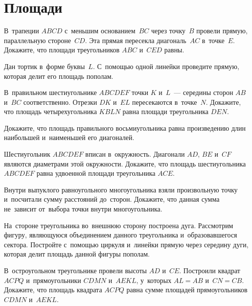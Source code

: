 
\section*{Площади}


\begin{problems}

\item
В~трапеции $ABCD$ с~меньшим основанием~$BC$ через точку~$B$ провели прямую,
параллельную стороне~$CD$.
Эта прямая пересекла диагональ~$AC$ в~точке~$E$.
Докажите, что площади треугольников $ABC$ и~$CED$ равны.

\item
Дан тортик в~форме буквы~$L$.
С~помощью одной линейки проведите прямую, которая
делит его площадь пополам.

\item
В~правильном шестиугольнике $ABCDEF$ точки $K$ и~$L$~---
середины сторон $AB$ и~$BC$ соответственно.
Отрезки $DK$ и~$EL$ пересекаются в~точке~$N$.
Докажите, что площадь четырехугольника $KBLN$ равна площади треугольника $DEN$.

\item
Докажите, что площадь правильного восьмиугольника равна произведению длин
наибольшей и~наименьшей его диагоналей.

\item
Шестиугольник $ABCDEF$ вписан в~окружность.
Диагонали $AD$, $BE$ и~$CF$ являются диаметрами этой окружности.
Докажите, что площадь шестиугольника $ABCDEF$ равна удвоенной площади
треугольника $ACE$.

\item
Внутри выпуклого равноугольного многоугольника взяли произвольную точку
и~посчитали сумму расстояний до~сторон.
Докажите, что данная сумма не~зависит от~выбора точки внутри многоугольника.

\item
На~стороне треугольника во~внешнюю сторону построена дуга.
Рассмотрим фигуру, являющуюся объединением данного треугольника
и~образовавшегося сектора.
Постройте с~помощью циркуля и~линейки прямую через середину дуги, которая делит
площадь данной фигуры пополам.

\item
В~остроугольном треугольнике провели высоты $AD$ и~$CE$.
Построили квадрат $ACPQ$ и~прямоугольники $CDMN$ и~$AEKL$, у~которых $AL = AB$
и~$CN = CB$.
Докажите, что площадь квадрата $ACPQ$ равна сумме площадей
прямоугольников $CDMN$ и~$AEKL$.


\end{problems}
